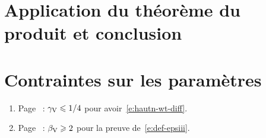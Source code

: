 
\section{Application du théorème du produit et conclusion}

\section{Contraintes sur les paramètres}

\begin{enumerate}
  \item Page~\pageref{ct:Vcos<1/4} : \( \gamma \sb{\mathrm{V}} \leqslant 1/4 \) pour
    avoir~\eqref{e:hautn-wt-diff}.
  \item Page~\pageref{ct:Vfar>2} : \( \beta \sb{\mathrm{V}} \geqslant 2 \) pour la preuve
    de~\eqref{e:def-epsiii}.
\end{enumerate}

\endinput

